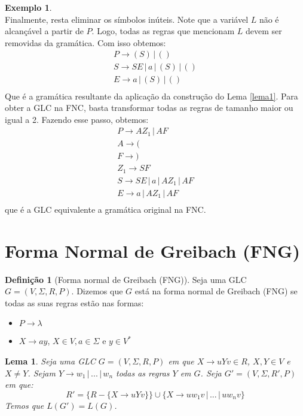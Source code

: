 \documentclass[a4paper]{article}
\newtheorem{Lemma}{Lema}
\theoremstyle{definition}
\newtheorem{Example}{Exemplo}
\newtheorem{Definition}{Definição}
\begin{document}
\begin{Example}
\[    \]
    Finalmente, resta eliminar os símbolos inúteis. Note que a variável $L$ não
    é alcançável a partir de $P$. Logo, todas as regras que mencionam $L$ devem
    ser removidas da gramática. Com isso obtemos:
    \[
      \begin{array}{l}
        P \to (S) \,|\, () \\
        S \to SE \,|\, a \,|\, (S)\,|\, ()\\
        E \to a \,|\, (S)\,|\,() \\
      \end{array}
    \]
    Que é a gramática resultante da aplicação da construção do Lema \ref{lema1}.
    Para obter a GLC na FNC, basta transformar todas as regras de tamanho maior
    ou igual a 2. Fazendo esse passo, obtemos:
    \[
      \begin{array}{l}
        P \to AZ_1 \,|\, AF \\
        A \to (\\
        F \to )\\
        Z_1 \to SF \\
        S \to SE \,|\, a \,|\, AZ_1\,|\, AF\\
        E \to a \,|\, AZ_1\,|\,AF \\
      \end{array}
    \]
    que é a GLC equivalente a gramática original na FNC.
  \end{Example}

  \section{Forma Normal de Greibach (FNG)}


  \begin{Definition}[Forma normal de Greibach (FNG)]
      Seja uma GLC $G=(V,\Sigma,R,P)$. Dizemos que $G$ está na forma normal de
    Greibach (FNG) se todas as suas regras estão nas formas:
    \begin{itemize}
      \item $P \to \lambda$
      \item $X \to ay$, $X \in V, a \in\Sigma$ e $y \in V^*$
    \end{itemize}
  \end{Definition}

  \begin{Lemma}\label{lema2}
    Seja uma GLC $G = (V,\Sigma,R,P)$ em que $X \to uYv \in R$, $X,Y \in V$ e $X
    \neq Y$. Sejam $Y \to w_1\,|\,...\,|\,w_n$ todas as regras $Y$ em $G$.
    Seja $G' = (V,\Sigma,R',P)$ em que:
    \[
      R' = \{R - \{X \to uYv\}\} \cup \{X \to uw_1v\,|\,...\,|\,uw_nv\}
    \]
    Temos que $L(G') = L(G)$.
  \end{Lemma}
  
\end{document}
